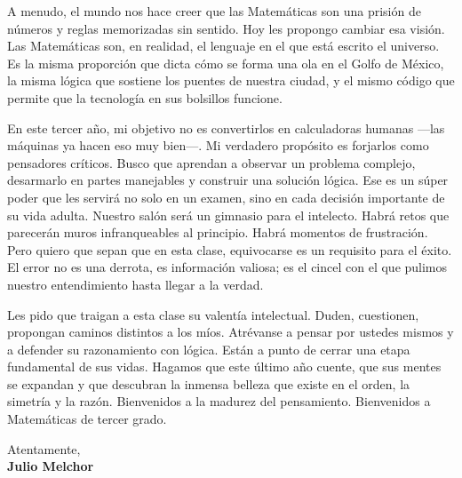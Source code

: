 \documentclass[11pt]{report}
\begin{document}
\begin{titlepage}
\vspace{0.7em}

A menudo, el mundo nos hace creer que las Matemáticas son una prisión de números y reglas memorizadas sin sentido. Hoy les propongo cambiar esa visión. Las Matemáticas son, en realidad, el lenguaje en el que está escrito el universo. Es la misma proporción que dicta cómo se forma una ola en el Golfo de México, la misma lógica que sostiene los puentes de nuestra ciudad, y el mismo código que permite que la tecnología en sus bolsillos funcione.

\vspace{0.7em}

En este tercer año, mi objetivo no es convertirlos en calculadoras humanas —las máquinas ya hacen eso muy bien—. Mi verdadero propósito es forjarlos como pensadores críticos. Busco que aprendan a observar un problema complejo, desarmarlo en partes manejables y construir una solución lógica. Ese es un súper poder que les servirá no solo en un examen, sino en cada decisión importante de su vida adulta. Nuestro salón será un gimnasio para el intelecto. Habrá retos que parecerán muros infranqueables al principio. Habrá momentos de frustración. Pero quiero que sepan que en esta clase, equivocarse es un requisito para el éxito. El error no es una derrota, es información valiosa; es el cincel con el que pulimos nuestro entendimiento hasta llegar a la verdad.

\vspace{0.7em}

Les pido que traigan a esta clase su valentía intelectual. Duden, cuestionen, propongan caminos distintos a los míos. Atrévanse a pensar por ustedes mismos y a defender su razonamiento con lógica. Están a punto de cerrar una etapa fundamental de sus vidas. Hagamos que este último año cuente, que sus mentes se expandan y que descubran la inmensa belleza que existe en el orden, la simetría y la razón.
Bienvenidos a la madurez del pensamiento. Bienvenidos a Matemáticas de tercer grado.

\vspace{0.7em}

\raggedright Atentamente,\\
\textbf{Julio Melchor}

\end{titlepage}
\end{document}
